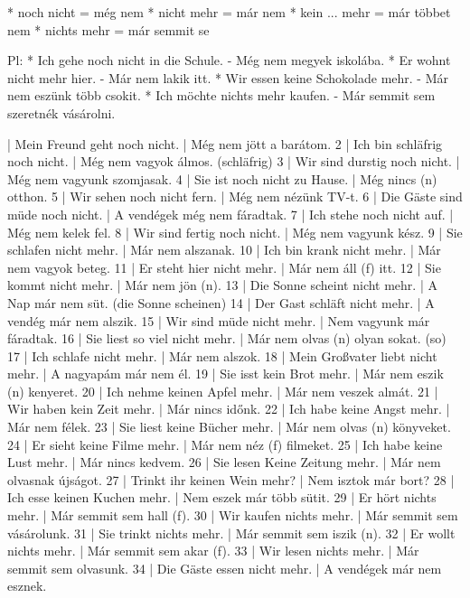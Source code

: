 \documentclass{article}
\newenvironment{desc}{\verbatim}{\endverbatim}
\newenvironment{exmp}{\verbatim}{\endverbatim}
\begin{document}
\begin{desc}
* noch nicht = még nem
* nicht mehr = már nem
* kein ... mehr = már többet nem
* nichts mehr = már semmit se

Pl: * Ich gehe noch nicht in die Schule. - Még nem megyek iskolába.
* Er wohnt nicht mehr hier. - Már nem lakik itt.
* Wir essen keine Schokolade mehr. - Már nem eszünk több csokit.
* Ich möchte nichts mehr kaufen. - Már semmit sem szeretnék vásárolni.
\end{desc}

\begin{exmp}
1 | Mein Freund geht noch nicht. | Még nem jött a barátom.
2 | Ich bin schläfrig noch nicht. | Még nem vagyok álmos. (schläfrig)
3 | Wir sind durstig noch nicht. | Még nem vagyunk szomjasak.
4 | Sie ist noch nicht zu Hause. | Még nincs (n) otthon.
5 | Wir sehen noch nicht fern. | Még nem nézünk TV-t.
6 | Die Gäste sind müde noch nicht. | A vendégek még nem fáradtak.
7 | Ich stehe noch nicht auf. | Még nem kelek fel.
8 | Wir sind fertig noch nicht. | Még nem vagyunk kész.
9 | Sie schlafen nicht mehr. | Már nem alszanak.
10 | Ich bin krank nicht mehr. | Már nem vagyok beteg.
11 | Er steht hier nicht mehr. | Már nem áll (f) itt.
12 | Sie kommt nicht mehr. | Már nem jön (n).
13 | Die Sonne scheint nicht mehr. | A Nap már nem süt. (die Sonne scheinen)
14 | Der Gast schläft nicht mehr. | A vendég már nem alszik.
15 | Wir sind müde nicht mehr. | Nem vagyunk már fáradtak.
16 | Sie liest so viel nicht mehr. | Már nem olvas (n) olyan sokat. (so)
17 | Ich schlafe nicht mehr. | Már nem alszok.
18 | Mein Großvater liebt nicht mehr. | A nagyapám már nem él.
19 | Sie isst kein Brot mehr. | Már nem eszik (n) kenyeret.
20 | Ich nehme keinen Apfel mehr. | Már nem veszek almát.
21 | Wir haben kein Zeit mehr. | Már nincs időnk.
22 | Ich habe keine Angst mehr. | Már nem félek.
23 | Sie liest keine Bücher mehr. | Már nem olvas (n) könyveket.
24 | Er sieht keine Filme mehr. | Már nem néz (f) filmeket.
25 | Ich habe keine Lust mehr. | Már nincs kedvem.
26 | Sie lesen Keine Zeitung mehr. | Már nem olvasnak újságot.
27 | Trinkt ihr keinen Wein mehr? | Nem isztok már bort?
28 | Ich esse keinen Kuchen mehr. | Nem eszek már több sütit.
29 | Er hört nichts mehr. | Már semmit sem hall (f).
30 | Wir kaufen nichts mehr. | Már semmit sem vásárolunk.
31 | Sie trinkt nichts mehr. | Már semmit sem iszik (n).
32 | Er wollt nichts mehr. | Már semmit sem akar (f).
33 | Wir lesen nichts mehr. | Már semmit sem olvasunk.
34 | Die Gäste essen nicht mehr. | A vendégek már nem esznek.
\end{exmp}
\end{document}
